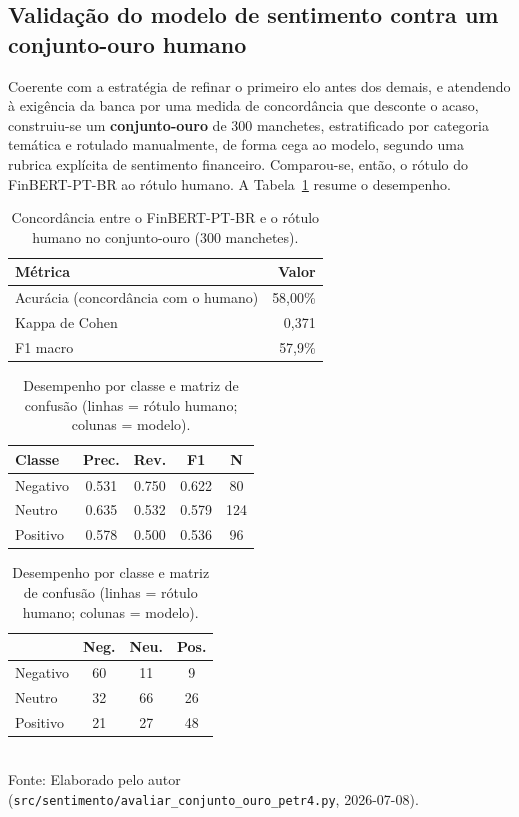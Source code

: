 \subsection{Validação do modelo de sentimento contra um conjunto-ouro humano}
\label{sec:validacao_sentimento}

Coerente com a estratégia de refinar o primeiro elo antes dos demais, e atendendo à exigência
da banca por uma medida de concordância que desconte o acaso, construiu-se um \textbf{conjunto-ouro}
de 300 manchetes, estratificado por categoria temática e rotulado manualmente, de forma
cega ao modelo, segundo uma rubrica explícita de sentimento financeiro. Comparou-se, então, o rótulo
do \mbox{FinBERT-PT-BR} ao rótulo humano. A Tabela~\ref{tab:validacao_sentimento} resume o desempenho.

\begin{table}[htpb]
\centering
\caption{Concordância entre o FinBERT-PT-BR e o rótulo humano no conjunto-ouro (300 manchetes).}
\label{tab:validacao_sentimento}
\begin{tabular}{l r}
\hline
\textbf{Métrica} & \textbf{Valor} \\ \hline
Acurácia (concordância com o humano) & 58,00\% \\
Kappa de Cohen & 0,371 \\
F1 macro & 57,9\% \\ \hline
\end{tabular}
\end{table}

\begin{table}[htpb]
\centering
\caption{Desempenho por classe e matriz de confusão (linhas = rótulo humano; colunas = modelo).}
\label{tab:validacao_sentimento_classe}
\begin{minipage}{0.52\textwidth}\centering
\begin{tabular}{l c c c c}
\hline
\textbf{Classe} & \textbf{Prec.} & \textbf{Rev.} & \textbf{F1} & \textbf{N} \\ \hline
Negativo & 0.531 & 0.750 & 0.622 & 80 \\
Neutro & 0.635 & 0.532 & 0.579 & 124 \\
Positivo & 0.578 & 0.500 & 0.536 & 96 \\
\hline
\end{tabular}
\end{minipage}\hfill
\begin{minipage}{0.44\textwidth}\centering
\begin{tabular}{l c c c}
\hline
 & \textbf{Neg.} & \textbf{Neu.} & \textbf{Pos.} \\ \hline
Negativo & 60 & 11 & 9 \\
Neutro & 32 & 66 & 26 \\
Positivo & 21 & 27 & 48 \\
\hline
\end{tabular}
\end{minipage}
\vspace{0.2cm}
{\small \\ Fonte: Elaborado pelo autor (\texttt{src/sentimento/avaliar\_conjunto\_ouro\_petr4.py}, 2026-07-08).}
\end{table}

